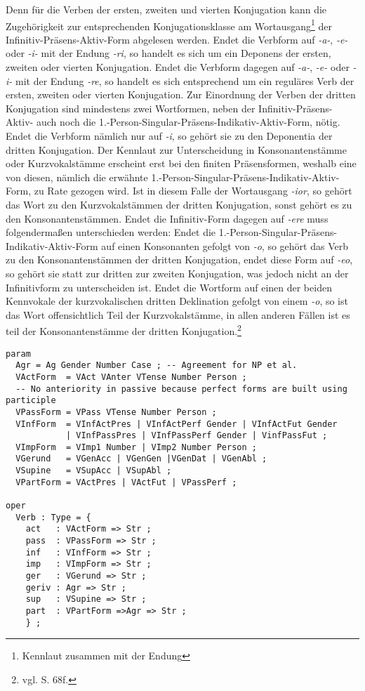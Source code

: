 Denn für die Verben der ersten, zweiten und vierten Konjugation kann die Zugehörigkeit zur entsprechenden Konjugationsklasse am Wortausgang\footnote{Kennlaut zusammen mit der Endung} der Infinitiv-Präsens-Aktiv-Form abgelesen werden. Endet die Verbform auf \textit{-a-}, \textit{-e-} oder \textit{-i-} mit der Endung \textit{-ri}, so handelt es sich um ein Deponens der ersten, zweiten oder vierten Konjugation. Endet die Verbform dagegen auf \textit{-a-}, \textit{-e-} oder \textit{-i-} mit der Endung \textit{-re}, so handelt es sich entsprechend um ein reguläres Verb der ersten, zweiten oder vierten Konjugation. Zur Einordnung der Verben der dritten Konjugation sind mindestens zwei Wortformen, neben der Infinitiv-Präsens-Aktiv- auch noch die 1.-Person-Singular-Präsens-Indikativ-Aktiv-Form, nötig. Endet die Verbform nämlich nur auf \textit{-i}, so gehört sie zu den Deponentia der dritten Konjugation. Der Kennlaut zur Unterscheidung in Konsonantenstämme oder Kurzvokalstämme erscheint erst bei den finiten Präsensformen, weshalb eine von diesen, nämlich die erwähnte 1.-Person-Singular-Präsens-Indikativ-Aktiv-Form, zu Rate gezogen wird. Ist in diesem Falle der Wortausgang \textit{-ior}, so gehört das Wort zu den Kurzvokalstämmen der dritten Konjugation, sonst gehört es zu den Konsonantenstämmen. Endet die Infinitiv-Form dagegen auf \textit{-ere} muss folgendermaßen unterschieden werden: Endet die 1.-Person-Singular-Präsens-Indikativ-Aktiv-Form auf einen Konsonanten gefolgt von \textit{-o}, so gehört das Verb zu den Konsonantenstämmen der dritten Konjugation, endet diese Form auf \textit{-eo}, so gehört sie statt zur dritten zur zweiten Konjugation, was jedoch nicht an der Infinitivform zu unterscheiden ist. Endet die Wortform auf einen der beiden Kennvokale der kurzvokalischen dritten Deklination gefolgt von einem \textit{-o}, so ist das Wort offensichtlich Teil der Kurzvokalstämme, in allen anderen Fällen ist es teil der Konsonantenstämme der dritten Konjugation.\footnote{vgl. \cite{BAYER-LINDAUER1994} S. 68f.} \par
\begin{lstlisting}[float=ht,label={GF-Res-Verb},caption={Datentyp eines Verbs im Grammatical Framework},basicstyle=\footnotesize]
param
  Agr = Ag Gender Number Case ; -- Agreement for NP et al.
  VActForm  = VAct VAnter VTense Number Person ;
  -- No anteriority in passive because perfect forms are built using participle
  VPassForm = VPass VTense Number Person ;  
  VInfForm  = VInfActPres | VInfActPerf Gender | VInfActFut Gender 
            | VInfPassPres | VInfPassPerf Gender | VinfPassFut ;
  VImpForm  = VImp1 Number | VImp2 Number Person ;
  VGerund   = VGenAcc | VGenGen |VGenDat | VGenAbl ;
  VSupine   = VSupAcc | VSupAbl ;
  VPartForm = VActPres | VActFut | VPassPerf ;

oper
  Verb : Type = {
    act   : VActForm => Str ;
    pass  : VPassForm => Str ;
    inf   : VInfForm => Str ;
    imp   : VImpForm => Str ;
    ger   : VGerund => Str ;
    geriv : Agr => Str ; 
    sup   : VSupine => Str ;
    part  : VPartForm =>Agr => Str ;
    } ;
\end{lstlisting}
\FloatBarrier
